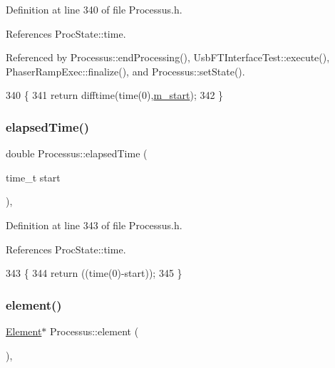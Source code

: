 Definition at line 340 of file Processus.\+h.



References Proc\+State\+::time.



Referenced by Processus\+::end\+Processing(), Usb\+F\+T\+Interface\+Test\+::execute(), Phaser\+Ramp\+Exec\+::finalize(), and Processus\+::set\+State().


\begin{DoxyCode}
340                        \{
341     \textcolor{keywordflow}{return} difftime(time(0),\hyperlink{classProcessus_a8ec00b2e12c5beada932610f30218e93}{m\_start});
342   \}
\end{DoxyCode}
\mbox{\label{classProcessus_a06d3815ad56593dfd0d3c1f534f8b146}} 
\subsubsection{\texorpdfstring{elapsed\+Time()}{elapsedTime()}\hspace{0.1cm}{\footnotesize\ttfamily [2/2]}}
{\footnotesize\ttfamily double Processus\+::elapsed\+Time (\begin{DoxyParamCaption}\item[{time\+\_\+t}]{start }\end{DoxyParamCaption})\hspace{0.3cm}{\ttfamily [inline]}, {\ttfamily [inherited]}}



Definition at line 343 of file Processus.\+h.



References Proc\+State\+::time.


\begin{DoxyCode}
343                                    \{
344     \textcolor{keywordflow}{return} ((time(0)-start));
345   \}
\end{DoxyCode}
\mbox{\label{classProcessus_a6fe155527431a7190b7d44d600b9608d}} 
\subsubsection{\texorpdfstring{element()}{element()}}
{\footnotesize\ttfamily \hyperlink{classElement}{Element}$\ast$ Processus\+::element (\begin{DoxyParamCaption}{ }\end{DoxyParamCaption})\hspace{0.3cm}{\ttfamily [inline]}, {\ttfamily [inherited]}}

